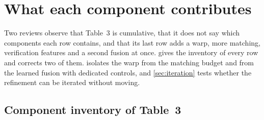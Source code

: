 \documentclass[10pt,twocolumn,letterpaper]{article}
\begin{document}
\section{What each component contributes}
\label{sec:ablation}

Two reviews observe that Table~3 is cumulative, that it does not say which components each row contains, and that its last row adds a warp, more matching, verification features and a second fusion at once.  gives the inventory of every row and corrects two of them.  isolates the warp from the matching budget and from the learned fusion with dedicated controls, and \cref{sec:iteration} tests whether the refinement can be iterated without moving.

\subsection{Component inventory of Table~3}
\label{sec:inventory}
\end{document}
